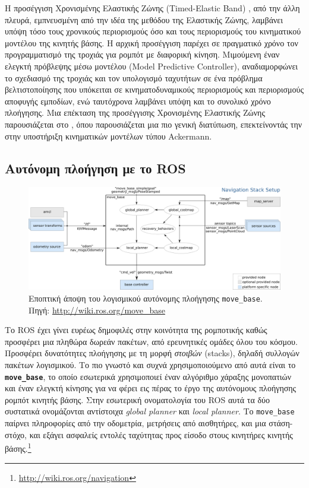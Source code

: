 Η προσέγγιση Χρονισμένης Ελαστικής Ζώνης (Timed-Elastic Band)
\cite{ChristophRoesmann}, από την άλλη πλευρά, εμπνευσμένη από την ιδέα της
μεθόδου της Ελαστικής Ζώνης, λαμβάνει υπόψη τόσο τους χρονικούς περιορισμούς
όσο και τους περιορισμούς του κινηματικού μοντέλου της κινητής βάσης. Η αρχική
προσέγγιση παρέχει σε πραγματικό χρόνο τον προγραμματισμό της τροχιάς για
ρομπότ με διαφορική κίνηση. Μιμούμενη έναν ελεγκτή πρόβλεψης μέσω μοντέλου
(Model Predictive Controller), αναδιαμορφώνει το σχεδιασμό της τροχιάς και τον
υπολογισμό ταχυτήτων σε ένα πρόβλημα βελτιστοποίησης που υπόκειται σε
κινηματοδυναμικούς περιορισμούς και περιορισμούς αποφυγής εμποδίων, ενώ
ταυτόχρονα λαμβάνει υπόψη και το συνολικό χρόνο πλοήγησης. Μια επέκταση της
προσέγγισης Χρονισμένης Ελαστικής Ζώνης παρουσιάζεται στο \cite{Rosmann2017},
όπου παρουσιάζεται μια πιο γενική διατύπωση, επεκτείνοντάς την στην υποστήριξη
κινηματικών μοντέλων τύπου Ackermann.


\subsection{Αυτόνομη πλοήγηση με το ROS}
\label{subsection:02_01_02:03}

\begin{figure}\centering
  \includegraphics[width=\textwidth]{./figures/parts/01/chapters/03/sections/01/move_base.png}
  \caption{\small Εποπτική άποψη του λογισμικού αυτόνομης πλοήγησης
           \texttt{move\_base}. Πηγή: \url{http://wiki.ros.org/move\_base}}
  \label{fig:movebase}
\end{figure}

Το ROS έχει γίνει ευρέως δημοφιλές στην κοινότητα της ρομποτικής καθώς
προσφέρει μια πληθώρα δωρεάν πακέτων, από ερευνητικές ομάδες όλου του κόσμου.
Προσφέρει δυνατότητες πλοήγησης με τη μορφή \textit{στοιβών} (stacks), δηλαδή
συλλογών πακέτων λογισμικού. Το πιο γνωστό και συχνά χρησιμοποιούμενο από αυτά
είναι το \texttt{\textbf{move\_base}}, το οποίο εσωτερικά χρησιμοποιεί έναν
αλγόριθμο χάραξης μονοπατιών και έναν ελεγκτή κίνησης για να φέρει εις πέρας
το έργο της αυτόνομους πλοήγησης ρομπότ κινητής βάσης. Στην εσωτερική
ονοματολογία του ROS αυτά τα δύο συστατικά ονομάζονται αντίστοιχα
\textit{global planner} και \textit{local planner}. Το \texttt{move\_base}
παίρνει πληροφορίες από την οδομετρία, μετρήσεις από αισθητήρες, και μια
στάση-στόχο, και εξάγει ασφαλείς εντολές ταχύτητας προς είσοδο στους κινητήρες
κινητής βάσης.\footnote{\url{http://wiki.ros.org/navigation}}

